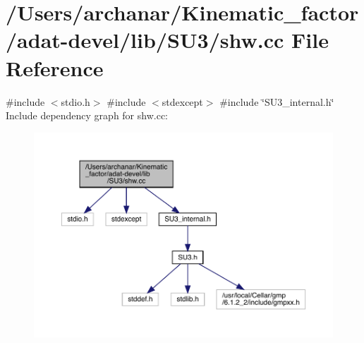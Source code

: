 \hypertarget{adat-devel_2lib_2SU3_2shw_8cc}{}\section{/\+Users/archanar/\+Kinematic\+\_\+factor/adat-\/devel/lib/\+S\+U3/shw.cc File Reference}
\label{adat-devel_2lib_2SU3_2shw_8cc}
{\ttfamily \#include $<$stdio.\+h$>$}\newline
{\ttfamily \#include $<$stdexcept$>$}\newline
{\ttfamily \#include \char`\"{}S\+U3\+\_\+internal.\+h\char`\"{}}\newline
Include dependency graph for shw.\+cc\+:
\nopagebreak
\begin{figure}[H]
\begin{center}
\leavevmode
\includegraphics[width=350pt]{db/dc2/adat-devel_2lib_2SU3_2shw_8cc__incl}
\end{center}
\end{figure}

